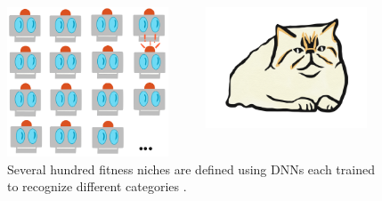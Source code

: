 \begin{figure}
    \centering
  \begin{columns}
  \begin{column}{0.6\textwidth}
  \includegraphics[width=0.9\textwidth]{img/dnn_collection}
   \end{column}
   \begin{column}{0.4\textwidth}
   \includegraphics[width=0.9\textwidth]{img/cat}
   \end{column}
	\end{columns}
\captionsetup{singlelinecheck=off,justification=raggedright}
  	\caption{Several hundred fitness niches are defined using DNNs each trained to recognize different categories \cite{Nguyen2015InnovationLearning}.}
    \label{fig:niches}
\end{figure}